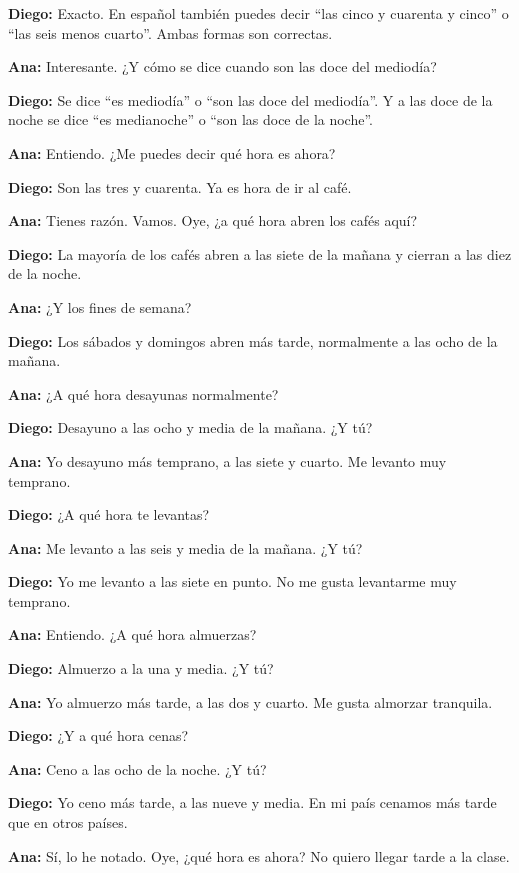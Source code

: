 \documentclass[12pt,a4paper]{article}
\begin{document}
\textbf{Diego:} Exacto. En español también puedes decir \enquote{las cinco y cuarenta y cinco} o \enquote{las seis menos cuarto}. Ambas formas son correctas.

\textbf{Ana:} Interesante. ¿Y cómo se dice cuando son las doce del mediodía?

\textbf{Diego:} Se dice \enquote{es mediodía} o \enquote{son las doce del mediodía}. Y a las doce de la noche se dice \enquote{es medianoche} o \enquote{son las doce de la noche}.

\textbf{Ana:} Entiendo. ¿Me puedes decir qué hora es ahora?

\textbf{Diego:} Son las tres y cuarenta. Ya es hora de ir al café.

\textbf{Ana:} Tienes razón. Vamos. Oye, ¿a qué hora abren los cafés aquí?

\textbf{Diego:} La mayoría de los cafés abren a las siete de la mañana y cierran a las diez de la noche.

\textbf{Ana:} ¿Y los fines de semana?

\textbf{Diego:} Los sábados y domingos abren más tarde, normalmente a las ocho de la mañana.

\textbf{Ana:} ¿A qué hora desayunas normalmente?

\textbf{Diego:} Desayuno a las ocho y media de la mañana. ¿Y tú?

\textbf{Ana:} Yo desayuno más temprano, a las siete y cuarto. Me levanto muy temprano.

\textbf{Diego:} ¿A qué hora te levantas?

\textbf{Ana:} Me levanto a las seis y media de la mañana. ¿Y tú?

\textbf{Diego:} Yo me levanto a las siete en punto. No me gusta levantarme muy temprano.

\textbf{Ana:} Entiendo. ¿A qué hora almuerzas?

\textbf{Diego:} Almuerzo a la una y media. ¿Y tú?

\textbf{Ana:} Yo almuerzo más tarde, a las dos y cuarto. Me gusta almorzar tranquila.

\textbf{Diego:} ¿Y a qué hora cenas?

\textbf{Ana:} Ceno a las ocho de la noche. ¿Y tú?

\textbf{Diego:} Yo ceno más tarde, a las nueve y media. En mi país cenamos más tarde que en otros países.

\textbf{Ana:} Sí, lo he notado. Oye, ¿qué hora es ahora? No quiero llegar tarde a la clase.
\end{document}

